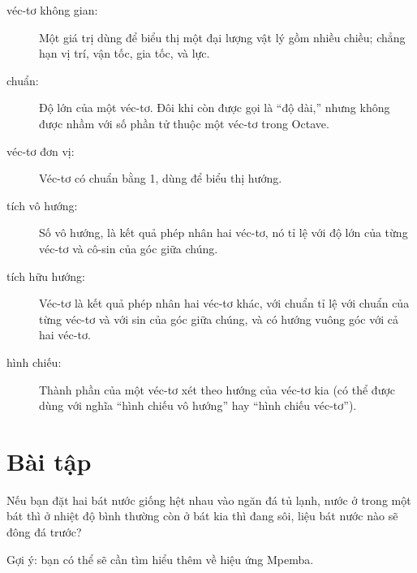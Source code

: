 \documentclass[12pt]{book}
\begin{document}
\begin{description}

\item[véc-tơ không gian:] Một giá trị dùng để biểu thị một đại lượng
vật lý gồm nhiều chiều; chẳng hạn vị trí, vận tốc, gia tốc, và lực.

\item[chuẩn:] Độ lớn của một véc-tơ. Đôi khi còn được gọi là ``độ dài,''
nhưng không được nhầm với số phần tử thuộc một véc-tơ trong Octave.

\item[véc-tơ đơn vị:] Véc-tơ có chuẩn bằng 1, dùng để biểu thị hướng.

\item[tích vô hướng:] Số vô hướng, là kết quả phép nhân hai véc-tơ, nó tỉ lệ với
độ lớn của từng véc-tơ và cô-sin của góc giữa chúng.

\item[tích hữu hướng:] Véc-tơ là kết quả phép nhân hai véc-tơ khác, với
chuẩn tỉ lệ với chuẩn của từng véc-tơ và với sin của góc giữa chúng,
và có hướng vuông góc với cả hai véc-tơ.

\item[hình chiếu:] Thành phần của một véc-tơ xét theo hướng của véc-tơ
kia (có thể được dùng với nghĩa ``hình chiếu vô hướng'' hay
``hình chiếu véc-tơ'').

\end{description}


\section{Bài tập}

\begin{ex}
Nếu bạn đặt hai bát nước giống hệt nhau vào ngăn đá tủ lạnh, nước ở
trong một bát thì ở nhiệt độ bình thường còn ở bát kia thì đang sôi, liệu
bát nước nào sẽ đông đá trước?

Gợi ý: bạn có thể sẽ cần tìm hiểu thêm về hiệu ứng Mpemba.

\end{ex}
\end{document}
